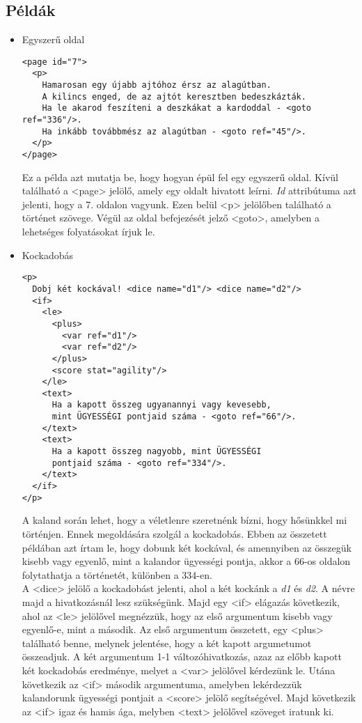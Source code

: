 \documentclass[12pt,a4paper,oneside]{report}
\newcommand{\xtag}[1]{{\color{Tag}#1}}
\newcommand{\attr}{\emph}
\begin{document}
    \subsection{Példák}
    \begin{itemize}
      \item Egyszerű oldal
        \begin{verbatim}
<page id="7">
  <p>
    Hamarosan egy újabb ajtóhoz érsz az alagútban.
    A kilincs enged, de az ajtót keresztben bedeszkázták.
    Ha le akarod feszíteni a deszkákat a kardoddal - <goto ref="336"/>.
    Ha inkább továbbmész az alagútban - <goto ref="45"/>.
  </p>
</page>
      \end{verbatim}
      Ez a példa azt mutatja be, hogy hogyan épül fel egy egyszerű
      oldal. Kívül található a <\xtag{page}> jelölő, amely egy
      oldalt hivatott leírni. \attr{Id} attribútuma azt jelenti, hogy a
      7. oldalon vagyunk. Ezen belül <\xtag{p}> jelölőben
      található a történet szövege. Végül az oldal befejezését jelző
      <\xtag{goto}>, amelyben a lehetséges folyatásokat írjuk
      le.
      \item Kockadobás
      
        \begin{verbatim}
<p>
  Dobj két kockával! <dice name="d1"/> <dice name="d2"/>
  <if>
    <le>
      <plus>
        <var ref="d1"/>
        <var ref="d2"/>
      </plus>
      <score stat="agility"/>
    </le>
    <text>
      Ha a kapott összeg ugyanannyi vagy kevesebb,
      mint ÜGYESSÉGI pontjaid száma - <goto ref="66"/>.
    </text>
    <text>
      Ha a kapott összeg nagyobb, mint ÜGYESSÉGI
      pontjaid száma - <goto ref="334"/>.
    </text>
  </if>
</p>
        \end{verbatim}
        A kaland során lehet, hogy a véletlenre szeretnénk bízni, hogy
        hősünkkel mi történjen. Ennek megoldására szolgál a
        kockadobás. Ebben az összetett példában azt írtam le, hogy
        dobunk két kockával, és amennyiben az összegük kisebb vagy
        egyenlő, mint a kalandor ügyességi pontja, akkor a 66-os oldalon
        folytathatja a történetét, különben a 334-en.\\
        A <\xtag{dice}> jelölő a
        kockadobást jelenti, ahol a két kockánk a \emph{d1} és \emph{d2}. A névre majd
        a hivatkozásnál lesz szükségünk. Majd egy <\xtag{if}> elágazás
        következik, ahol az <\xtag{le}> jelölővel megnézzük, hogy az első
        argumentum kisebb vagy egyenlő-e, mint a második. Az első
        argumentum összetett, egy <\xtag{plus}> található benne, melynek
        jelentése, hogy a két kapott argumetumot összeadjuk. A két
        argumentum 1-1 változóhivatkozás, azaz az előbb kapott két
        kockadobás eredménye, melyet a <\xtag{var}> jelölővel kérdezünk
        le. Utána következik az <\xtag{if}> második argumentuma, amelyben
        lekérdezzük kalandorunk ügyességi pontjait a <\xtag{score}> jelölő
        segítségével. Majd következik az <\xtag{if}> igaz és hamis ága, melyben
        <\xtag{text}> jelölővel szöveget iratunk ki.
      

\end{itemize}
\end{document}
